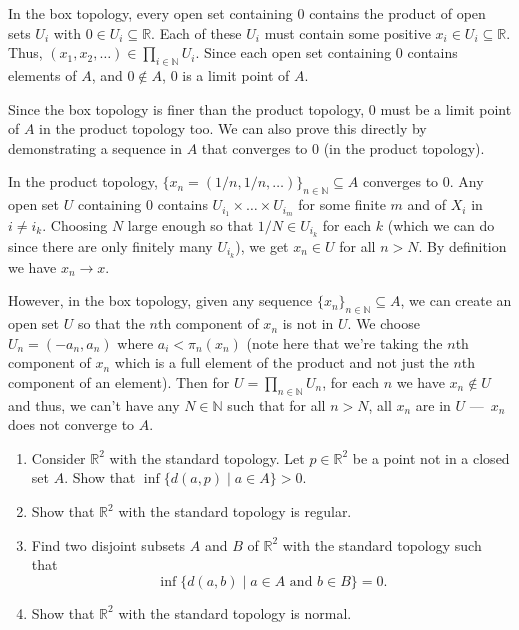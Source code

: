 \documentclass[12 pt, letterpaper]{hmcpset}
\begin{document}
\begin{solution}
	In the box topology, every open set containing $0$ contains the product of open sets $U_{i}$ with $0 \in U_{i} \subseteq \mathbb{R}$. Each of these $U_{i}$ must contain some positive $x_{i} \in U_{i} \subseteq \mathbb{R}$. Thus, $(x_{1}, x_{2}, \dots) \in \prod_{i \in \mathbb{N}} U_{i}$. Since each open set containing $0$ contains elements of $A$, and $0 \not\in A$, $0$ is a limit point of $A$.

Since the box topology is finer than the product topology, $0$ must be a limit point of $A$ in the product topology too. We can also prove this directly by demonstrating a sequence in $A$ that converges to $0$ (in the product topology).

In the product topology, $\{ x_{n} = (1 / n, 1 / n, \dots) \}_{n \in \mathbb{N}} \subseteq A$ converges to $0$. Any open set $U$ containing $0$ contains $U_{i_{1}} \times \dots \times U_{i_{m}}$ for some finite $m$ and of $X_{i}$ in $i \neq i_{k}$. Choosing $N$ large enough so that $1 / N \in U_{i_{k}}$ for each $k$ (which we can do since there are only finitely many $U_{i_{k}}$), we get $x_{n} \in U$ for all $n > N$. By definition we have $x_{n} \to x$.

However, in the box topology, given any sequence $\{ x_{n} \}_{n \in \mathbb{N}} \subseteq A$, we can create an open set $U$ so that the $n$th component of $x_{n}$ is not in $U$. We choose $U_{n} = (-a_{n}, a_{n})$ where $a_{i} < \pi_{n}(x_{n})$ (note here that we're taking the $n$th component of $x_{n}$ which is a full element of the product and not just the $n$th component of an element). Then for $U = \prod_{n \in \mathbb{N}} U_{n}$, for each $n$ we have $x_{n} \not\in U$ and thus, we can't have any $N \in \mathbb{N}$ such that for all $n > N$, all $x_{n}$ are in $U$ — $x_{n}$ does not converge to $A$.
\end{solution}

\pagebreak

\begin{problem}[4.6]
	\begin{enumerate}
		\item Consider $\mathbb{R}^{2}$ with the standard topology. Let $p \in \mathbb{R}^{2}$ be a point not in a closed set $A$. Show that $\inf \{ d(a, p) \mid a \in A \} > 0$.
		\item Show that $\mathbb{R}^{2}$ with the standard topology is regular.
		\item Find two disjoint subsets $A$ and $B$ of $\mathbb{R}^{2}$ with the standard topology such that
			 \[
				\inf \{ d(a, b) \mid a \in A \text{ and } b \in B \} = 0.
			\]
		\item Show that $\mathbb{R}^{2}$ with the standard topology is normal.
	\end{enumerate}
\end{problem}
\end{document}
